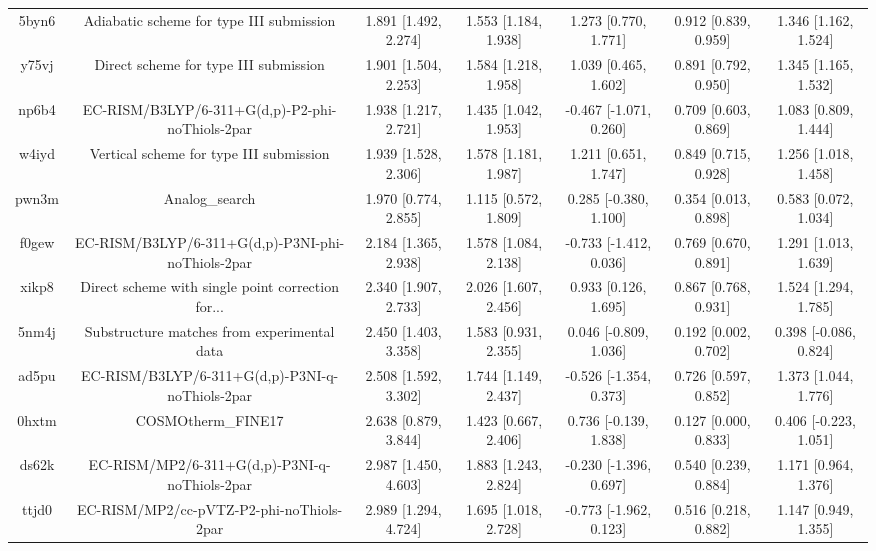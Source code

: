 \documentclass{article}
\begin{document}
\begin{center}
\begin{longtable}{|ccccccc|}
 5byn6 &           Adiabatic scheme for type III submission &  1.891 [1.492, 2.274] &  1.553 [1.184, 1.938] &     1.273 [0.770, 1.771] &  0.912 [0.839, 0.959] &   1.346 [1.162, 1.524] \\
 y75vj &              Direct scheme for type III submission &  1.901 [1.504, 2.253] &  1.584 [1.218, 1.958] &     1.039 [0.465, 1.602] &  0.891 [0.792, 0.950] &   1.345 [1.165, 1.532] \\
 np6b4 &    EC-RISM/B3LYP/6-311+G(d,p)-P2-phi-noThiols-2par &  1.938 [1.217, 2.721] &  1.435 [1.042, 1.953] &   -0.467 [-1.071, 0.260] &  0.709 [0.603, 0.869] &   1.083 [0.809, 1.444] \\
 w4iyd &            Vertical scheme for type III submission &  1.939 [1.528, 2.306] &  1.578 [1.181, 1.987] &     1.211 [0.651, 1.747] &  0.849 [0.715, 0.928] &   1.256 [1.018, 1.458] \\
 pwn3m &                                     Analog\_search &  1.970 [0.774, 2.855] &  1.115 [0.572, 1.809] &    0.285 [-0.380, 1.100] &  0.354 [0.013, 0.898] &   0.583 [0.072, 1.034] \\
 f0gew &  EC-RISM/B3LYP/6-311+G(d,p)-P3NI-phi-noThiols-2par &  2.184 [1.365, 2.938] &  1.578 [1.084, 2.138] &   -0.733 [-1.412, 0.036] &  0.769 [0.670, 0.891] &   1.291 [1.013, 1.639] \\
 xikp8 &  Direct scheme with single point correction for... &  2.340 [1.907, 2.733] &  2.026 [1.607, 2.456] &     0.933 [0.126, 1.695] &  0.867 [0.768, 0.931] &   1.524 [1.294, 1.785] \\
 5nm4j &        Substructure matches from experimental data &  2.450 [1.403, 3.358] &  1.583 [0.931, 2.355] &    0.046 [-0.809, 1.036] &  0.192 [0.002, 0.702] &  0.398 [-0.086, 0.824] \\
 ad5pu &    EC-RISM/B3LYP/6-311+G(d,p)-P3NI-q-noThiols-2par &  2.508 [1.592, 3.302] &  1.744 [1.149, 2.437] &   -0.526 [-1.354, 0.373] &  0.726 [0.597, 0.852] &   1.373 [1.044, 1.776] \\
 0hxtm &                                 COSMOtherm\_FINE17 &  2.638 [0.879, 3.844] &  1.423 [0.667, 2.406] &    0.736 [-0.139, 1.838] &  0.127 [0.000, 0.833] &  0.406 [-0.223, 1.051] \\
 ds62k &      EC-RISM/MP2/6-311+G(d,p)-P3NI-q-noThiols-2par &  2.987 [1.450, 4.603] &  1.883 [1.243, 2.824] &   -0.230 [-1.396, 0.697] &  0.540 [0.239, 0.884] &   1.171 [0.964, 1.376] \\
 ttjd0 &           EC-RISM/MP2/cc-pVTZ-P2-phi-noThiols-2par &  2.989 [1.294, 4.724] &  1.695 [1.018, 2.728] &   -0.773 [-1.962, 0.123] &  0.516 [0.218, 0.882] &   1.147 [0.949, 1.355] \\

\end{longtable}
\end{center}
\end{document}

